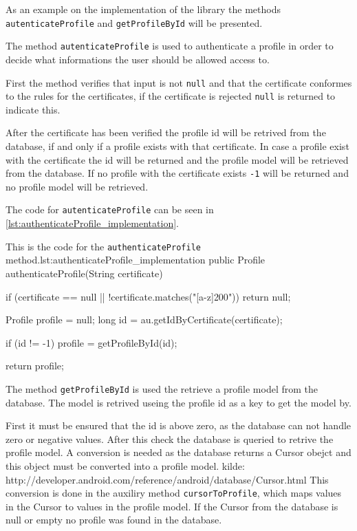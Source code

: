 As an example on the implementation of the library the methods \texttt{autenticateProfile} and \texttt{getProfileById} will be presented.

The method \texttt{autenticateProfile} is used to authenticate a profile in order to decide what informations the user should be allowed access to.

First the method verifies that input is not \texttt{null} and that the certificate conformes to the rules for the certificates, if the certificate is rejected \texttt{null} is returned to indicate this.

After the certificate has been verified the profile id will be retrived from the database, if and only if a profile exists with that certificate.
In case a profile exist with the certificate the id will be returned and the profile model will be retrieved from the database.
If no profile with the certificate exists \texttt{-1} will be returned and no profile model will be retrieved.

The code for \texttt{autenticateProfile} can be seen in \autoref{lst:authenticateProfile_implementation}.

\begin{Java}{This is the code for the \texttt{authenticateProfile} method.}{lst:authenticateProfile_implementation}
public Profile authenticateProfile(String certificate) {
	if (certificate == null || !certificate.matches("[a-z]{200}")) {
		return null;
	}

	Profile profile = null;
	long id = au.getIdByCertificate(certificate);

	if (id != -1) {
		profile = getProfileById(id);
	}

	return profile;
}
\end{Java}

The method \texttt{getProfileById} is used the retrieve a profile model from the database.
The model is retrived useing the profile id as a key to get the model by.

First it must be ensured that the id is above zero, as the database can not handle zero or negative values.
After this check the database is queried to retrive the profile model.
A conversion is needed as the database returns a Cursor obejct and this object must be converted into a profile model. kilde: http://developer.android.com/reference/android/database/Cursor.html
This conversion is done in the auxiliry method \texttt{cursorToProfile}, which maps values in the Cursor to values in the profile model.
If the Cursor from the database is null or empty no profile was found in the database.

